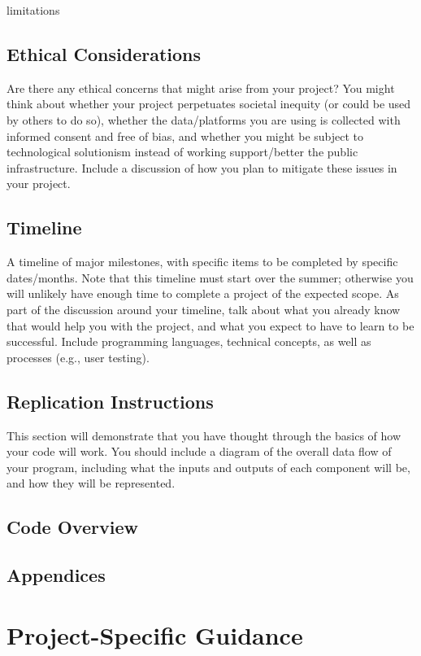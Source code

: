 \documentclass[10pt,twocolumn]{article}
\begin{document}
limitations

\subsection{Ethical Considerations}

Are there any ethical concerns that might arise from your project?
You might think about whether your project perpetuates societal inequity (or could be used by others to do so), whether the data/platforms you are using is collected with informed consent and free of bias, and whether you might be subject to technological solutionism instead of working support/better the public infrastructure.
Include a discussion of how you plan to mitigate these issues in your project.

\subsection{Timeline}

A timeline of major milestones, with specific items to be completed by specific dates/months.
Note that this timeline must start over the summer; otherwise you will unlikely have enough time to complete a project of the expected scope.
As part of the discussion around your timeline, talk about what you already know that would help you with the project, and what you expect to have to learn to be successful.
Include programming languages, technical concepts, as well as processes (e.g., user testing).

\subsection{Replication Instructions}

This section will demonstrate that you have thought through the basics of how your code will work. You should include a diagram of the overall data flow of your program, including what the inputs and outputs of each component will be, and how they will be represented.

\subsection{Code Overview}

\subsection{Appendices}

\section{Project-Specific Guidance}
\end{document}
